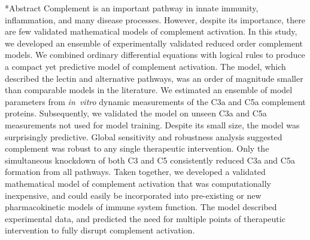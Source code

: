 \documentclass[12pt]{article}
\makeatletter
\renewcommand\section{\@startsection
	{subsection}{2}{0mm}
	{-0.2in}
	{0.05\baselineskip}
	{\normalfont\large\bfseries}}
\makeatother
\begin{document}
\section*{Abstract}
Complement is an important pathway in innate immunity, inflammation, and many disease processes.
However, despite its importance, there are few validated mathematical models of complement activation.
In this study, we developed an ensemble of experimentally validated reduced order complement models.
We combined ordinary differential equations with logical rules to produce a compact yet predictive model of complement activation.
The model,  which described the lectin and alternative pathways, was an order of magnitude smaller than comparable models in the literature.
We estimated an ensemble of model parameters from \textit{in~vitro} dynamic measurements of the C3a and C5a complement proteins.
Subsequently, we validated the model on unseen C3a and C5a measurements not used for model training.
Despite its small size, the model was surprisingly predictive.
Global sensitivity and robustness analysis suggested complement was robust to any single therapeutic intervention.
Only the simultaneous knockdown of both C3 and C5 consistently reduced C3a and C5a formation from all pathways.
Taken together, we developed a validated mathematical model of complement activation that was computationally inexpensive,
and could easily be incorporated into pre-existing or new pharmacokinetic models of immune system function.
The model described experimental data, and predicted the need for multiple points of therapeutic intervention to fully disrupt complement activation.

\end{document}
